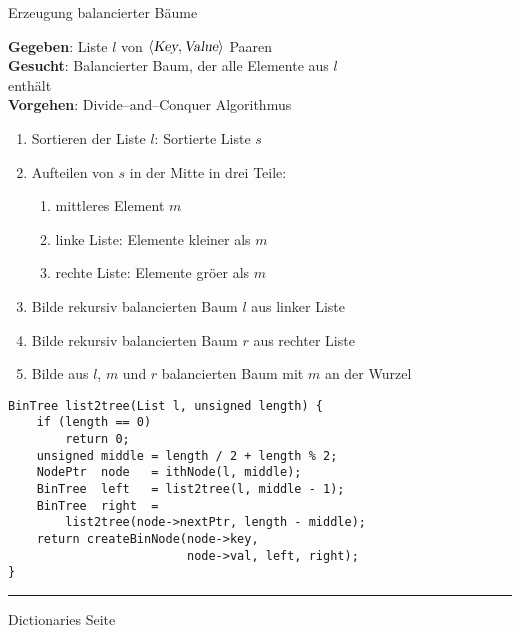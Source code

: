 
\begin{slide}{}
\normalsize

\begin{center}
Erzeugung balancierter B\"aume
\end{center}
\vspace*{0.5cm}

\footnotesize
\textbf{Gegeben}: Liste $l$ von $\langle\textsl{Key}, \textsl{Value}\rangle$ Paaren \\[0.3cm]
\textbf{Gesucht}: Balancierter Baum, der alle Elemente aus $l$ \\
\hspace*{2.88cm} enth\"alt \\[0.3cm]
\textbf{Vorgehen}: Divide--and--Conquer Algorithmus
\begin{enumerate}
\item Sortieren der Liste $l$: Sortierte Liste $s$
\item Aufteilen von $s$ in der Mitte in drei Teile:
  \begin{enumerate}
  \item mittleres Element $m$
  \item linke Liste: Elemente kleiner als $m$
  \item rechte Liste: Elemente gr\"o\3er als $m$
  \end{enumerate}
\item Bilde rekursiv balancierten Baum $l$ aus linker Liste
\item Bilde rekursiv balancierten Baum $r$ aus rechter Liste
\item Bilde aus $l$, $m$ und $r$ balancierten Baum mit $m$ an der Wurzel
\end{enumerate}

\begin{verbatim}
BinTree list2tree(List l, unsigned length) {
    if (length == 0)
        return 0;
    unsigned middle = length / 2 + length % 2;
    NodePtr  node   = ithNode(l, middle);
    BinTree  left   = list2tree(l, middle - 1);
    BinTree  right  = 
        list2tree(node->nextPtr, length - middle);
    return createBinNode(node->key, 
                         node->val, left, right);    
}
\end{verbatim}

\vspace*{\fill}
\tiny \addtocounter{mypage}{1}
\rule{17cm}{1mm}
Dictionaries  \hspace*{\fill} Seite 
\end{slide}

